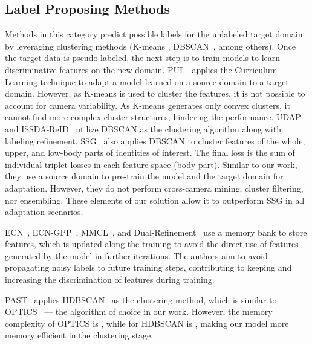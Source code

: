 \documentclass[journal]{IEEEtran}
\begin{document}
\subsection{Label Proposing Methods} 
Methods in this category predict possible labels for the unlabeled target domain by leveraging clustering methods (K-means \cite{lloyd1982kmeans}, DBSCAN~\cite{ester1996density}, among others). Once the target data is pseudo-labeled, the next step is to train models to learn discriminative features on the new domain. PUL~\cite{fan2018unsupervised} applies the Curriculum Learning technique to adapt a model learned on a source domain to a target domain. However, as K-means is used to cluster the features, it is not possible to account for camera variability. As K-means generates only convex clusters, it cannot find more complex cluster structures, hindering the performance. UDAP~\cite{song2020unsupervised} and ISSDA-ReID~\cite{tang2019unsupervised} utilize DBSCAN as the clustering algorithm along with labeling refinement.
SSG~\cite{fu2019self} also applies DBSCAN to cluster features of the whole, upper, and low-body parts of identities of interest. The final loss is the sum of individual triplet losses in each feature space (body part). Similar to our work, they use a source domain to pre-train the model and the target domain for adaptation. However, they do not perform cross-camera mining, cluster filtering, nor ensembling. These elements of our solution allow it to outperform SSG in all adaptation scenarios. \par  

ECN~\cite{zhong2019invariance}, ECN-GPP~\cite{zhong2020learning}, MMCL~\cite{wang2020unsupervised}, and Dual-Refinement~\cite{dai2020dual} use a memory bank to store features, which is updated along the training to avoid the direct use of features generated by the model in further iterations. The authors aim to avoid propagating noisy labels to future training steps, contributing to keeping and increasing the discrimination of features during training. \par  

PAST~\cite{zhang2019self} applies HDBSCAN~\cite{campello2013density} as the clustering method, which is similar to OPTICS~\cite{ankerst1999optics} --- the algorithm of choice in our work. However, the memory complexity of OPTICS is , while for HDBSCAN is , making our model more memory efficient in the clustering stage.   \par 
\end{document}
